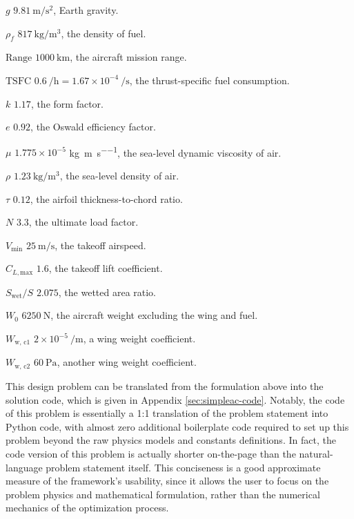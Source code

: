 \begin{example}
    \begin{eqexpl}
        \item {$g$} $9.81\ \si{\meter/\second\squared}$, Earth gravity.
        \item {$\rho_f$} $817\ \si{\kg/\meter\cubed}$, the density of fuel.
        \item {$\text{Range}$} $1000\ \si{\kilo\meter}$, the aircraft mission range.
        \item {$\text{TSFC}$} $0.6\ \si{\per\hour} = 1.67 \times 10^{-4}\ \si{\per\second}$, the thrust-specific fuel consumption.
        \item {$k$} $1.17$, the form factor.
        \item {$e$} $0.92$, the Oswald efficiency factor.
        \item {$\mu$} $1.775 \times 10^{-5}$ \si{\kg\per\meter\per\second}, the sea-level dynamic viscosity of air.
        \item {$\rho$} $1.23\ \si{\kg/\meter\cubed}$, the sea-level density of air.
        \item {$\tau$} $0.12$, the airfoil thickness-to-chord ratio.
        \item {$N$} $3.3$, the ultimate load factor.
        \item {$V_\text{min}$} $25\ \si{\meter/\second}$, the takeoff airspeed.
        \item {$C_{L, \text{max}}$} $1.6$, the takeoff lift coefficient.
        \item {$S_\text{wet}/S$} $2.075$, the wetted area ratio.
        \item {$W_0$} $6250\ \si{\newton}$, the aircraft weight excluding the wing and fuel.
        \item {$W_\text{w, c1}$} $2 \times 10^{-5}\ \si{\per\meter}$, a wing weight coefficient.
        \item {$W_\text{w, c2}$} $60\ \si{\Pa}$, another wing weight coefficient.
    \end{eqexpl}

\end{example}

This design problem can be translated from the formulation above into the solution code, which is given in Appendix \ref{sec:simpleac-code}. Notably, the code of this problem is essentially a 1:1 translation of the problem statement into Python code, with almost zero additional boilerplate code required to set up this problem beyond the raw physics models and constants definitions. In fact, the code version of this problem is actually shorter on-the-page than the natural-language problem statement itself. This conciseness is a good approximate measure of the framework's usability, since it allows the user to focus on the problem physics and mathematical formulation, rather than the numerical mechanics of the optimization process.

